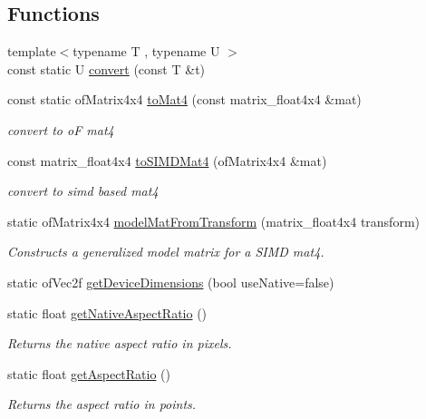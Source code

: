 \subsection*{Functions}
\begin{DoxyCompactItemize}
\item 
{\footnotesize template$<$typename T , typename U $>$ }\\const static U \hyperlink{namespace_a_r_common_ab67b42b84c068f0c4ab2401ea3af86c6}{convert} (const T \&t)
\item 
const static of\+Matrix4x4 \hyperlink{namespace_a_r_common_a78fc93a50ebb387050bae7d69d2a8cce}{to\+Mat4} (const matrix\+\_\+float4x4 \&mat)
\begin{DoxyCompactList}\small\item\em convert to oF mat4 \end{DoxyCompactList}\item 
const matrix\+\_\+float4x4 \hyperlink{namespace_a_r_common_ad6930ed2b61bca10da347b8bb398d3b8}{to\+S\+I\+M\+D\+Mat4} (of\+Matrix4x4 \&mat)
\begin{DoxyCompactList}\small\item\em convert to simd based mat4 \end{DoxyCompactList}\item 
static of\+Matrix4x4 \hyperlink{namespace_a_r_common_aec58705c71590506c5f1f86e927f11e1}{model\+Mat\+From\+Transform} (matrix\+\_\+float4x4 transform)
\begin{DoxyCompactList}\small\item\em Constructs a generalized model matrix for a S\+I\+MD mat4. \end{DoxyCompactList}\item 
static of\+Vec2f \hyperlink{namespace_a_r_common_a37407572659749170d1906046fa1921c}{get\+Device\+Dimensions} (bool use\+Native=false)
\item 
static float \hyperlink{namespace_a_r_common_a00f3449531f154cba4a751128117052f}{get\+Native\+Aspect\+Ratio} ()
\begin{DoxyCompactList}\small\item\em Returns the native aspect ratio in pixels. \end{DoxyCompactList}\item 
static float \hyperlink{namespace_a_r_common_a5c33a5f3620614da8b3be53f6811d7ca}{get\+Aspect\+Ratio} ()
\begin{DoxyCompactList}\small\item\em Returns the aspect ratio in points. \end{DoxyCompactList}\end{DoxyCompactItemize}


